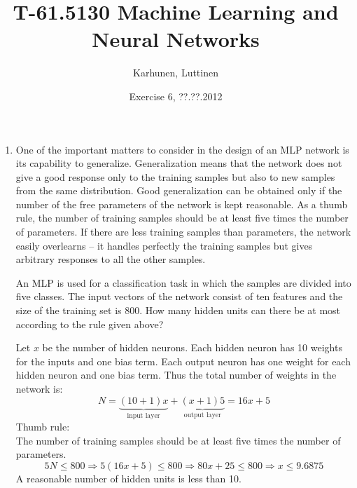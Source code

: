 \title{T-61.5130 Machine Learning and Neural Networks}
\author{Karhunen, Luttinen}
\date{Exercise 6, ??.??.2012}

\newcommand{\vect}[1]{{\bf{#1}}}
\newcommand{\svect}[1]{\boldsymbol{#1}}
\newcommand{\matr}[1]{\boldsymbol{#1}}
\newcommand{\T}{\mathcal{T}}
\newcommand{\x}{{\bf x}}





\maketitle

\begin{enumerate}

\item One of the important matters to consider in the design of an MLP
  network is its capability to generalize. Generalization means that
  the network does not give a good response only to the training
  samples but also to new samples from the same distribution. Good
  generalization can be obtained only if the number of the free
  parameters of the network is kept reasonable. As a thumb rule, the
  number of training samples should be at least five times the number
  of parameters. If there are less training samples than parameters,
  the network easily overlearns -- it handles perfectly the training
  samples but gives arbitrary responses to all the other samples.

  An MLP is used for a classification task in which the samples are
  divided into five classes. The input vectors of the network consist
  of ten features and the size of the training set is 800. How many
  hidden units can there be at most according to the rule given above?

  \begin{solution}

    Let $x$ be the number of hidden neurons. Each hidden neuron has
    10 weights for the inputs and one bias term. Each output neuron has one
    weight for each hidden neuron and one bias term. Thus the total number
    of weights in the network is:
    \begin{equation*}
      N=\underbrace{(10+1)x}_{\text{input
          layer}}+\underbrace{(x+1)5}_{\text{output layer}}=16x+5
    \end{equation*}
    Thumb rule:\\
    The number of  training samples should be at least five times the
    number of parameters.
    \begin{equation*}
      5N\leq800 \Rightarrow 5(16x+5)\leq 800\Rightarrow 80x+25\leq
      800\Rightarrow x\leq9.6875
    \end{equation*}
    A reasonable number of hidden units is less than 10.
  \end{solution}
  


\end{enumerate}
